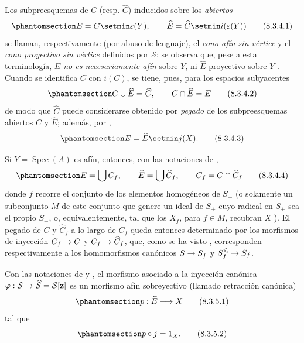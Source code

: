 \documentclass[oneside,10pt]{amsart}
\makeatletter
\renewcommand{\leq}{\leqslant}
\newcommand{\ega@arrow}[2]{\mathchoice{#1}{#2}{#2}{#2}}
\renewcommand{\to}{\ega@arrow{\longrightarrow}{\rightarrow}}
\newcommand{\oldpage}[2][]{\marginnote{\normalfont\footnotesize\textbf{#1}~|~#2}\ignorespaces}
\let\EGAOriginalLabel\label
\renewcommand{\label}[1]{\phantomsection\EGAOriginalLabel{#1}}
\makeatother
\begin{document}
\begin{env}[8.3.4]
\label{II.8.3.4-fr}
Los subpreesquemas de $C$ (resp. $\widehat{C}$) inducidos sobre los \emph{abiertos}
\begin{equation}
\label{II.8.3.4.1-fr}
  E=C\setmin\varepsilon(Y),\qquad
  \widehat{E}=\widehat{C}\setmin i(\varepsilon(Y))
\tag{8.3.4.1}
\end{equation}
se llaman, respectivamente (por abuso de lenguaje), el \emph{cono afín sin vértice} y el \emph{cono proyectivo sin vértice} definidos por $\mathcal{S}$;
se observa que, pese a esta terminología, \emph{$E$ no es necesariamente afín} sobre $Y$, ni $\widehat{E}$ proyectivo sobre $Y$ .
Cuando se identifica $C$ con $i(C)$, se tiene, pues, para los espacios subyacentes
\begin{equation}
\label{II.8.3.4.2-fr}
  C\cup\widehat{E}=\widehat{C},\qquad C\cap\widehat{E}=E
\tag{8.3.4.2}
\end{equation}
de modo que $\widehat{C}$ puede considerarse obtenido por \emph{pegado} de los subpreesquemas abiertos $C$ y $\widehat{E}$;
además, por ,
\begin{equation}
\label{II.8.3.4.3-fr}
  E=\widehat{E}\setmin j(X).
\tag{8.3.4.3}
\end{equation}

\oldpage[II]{165}
Si $Y=\operatorname{Spec}(A)$ es afín, entonces, con las notaciones de ,
\begin{equation}
\label{II.8.3.4.4-fr}
  E=\bigcup C_f,\qquad
  \widehat{E}=\bigcup\widehat{C}_f,\qquad
  C_f=C\cap\widehat{C}_f
\tag{8.3.4.4}
\end{equation}
donde $f$ recorre el conjunto de los elementos homogéneos de $S_+$ (o solamente un subconjunto $M$ de este conjunto que genere un ideal de $S_+$ cuyo radical en $S_+$ sea el propio $S_+$, o, equivalentemente, tal que los $X_f$, para $f\in M$, recubran $X$ ).
El pegado de $C$ y $\widehat{C}_f$ a lo largo de $C_f$ queda entonces determinado por los morfismos de inyección $C_f\to C$ y $C_f\to\widehat{C}_f$, que, como se ha visto , corresponden respectivamente a los homomorfismos canónicos $S\to S_f$ y $S_f^{\leq}\to S_f$.
\end{env}
\begin{proposition}[8.3.5]
\label{II.8.3.5-fr}
Con las notaciones de  y , el morfismo asociado  a la inyección canónica $\varphi:\mathcal{S}\to\widehat{\mathcal{S}}=\mathcal{S}[\mathbf{z}]$ es un morfismo afín sobreyectivo \textup{(llamado} retracción canónica)
\begin{equation}
\label{II.8.3.5.1-fr}
  p:\widehat{E}\to X
\tag{8.3.5.1}
\end{equation}
tal que
\begin{equation}
\label{II.8.3.5.2-fr}
  p\circ j=1_X.
\tag{8.3.5.2}
\end{equation}
\end{proposition}
\end{document}
